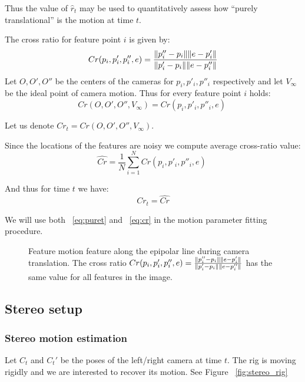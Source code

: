 \documentclass[10pt]{article}         %
\DeclarePairedDelimiter\norm{\lVert}{\rVert}%
\begin{document}
Thus the value of $\hat{r}_t$ may be used to quantitatively assess how
``purely translational'' is the motion at time $t$.

The cross ratio for feature point $i$ is given by:
\[
Cr(p_i,p'_i,p''_i,e) =
\frac{\norm{p''_i-p_i}\norm{e-p'_i}}{\norm{p'_i-p_i}\norm{e-p''_i}}
\]
Let $O,O',O''$ be the centers of the cameras for $p_i,p'_i,p''_i$
respectively and let $V_\infty$ be the ideal point of camera motion.
Thus for every feature point $i$ holds:
\[
Cr(O,O',O'',V_{\infty}) = Cr(p_i,p'_i,p''_i,e) \;
\]

Let us denote $Cr_t = Cr(O,O',O'',V_{\infty})$.

Since the locations of the features are noisy we compute average
cross-ratio value:
\[
\hat{Cr} =  \frac{1}{N}\sum_{i=1}^NCr(p_i,p'_i,p''_i,e) \;
\]

And thus for time $t$ we have:
\begin{equation}\label{eq:cr}
  Cr_t = \hat{Cr}
\end{equation}

We will use both ~\ref{eq:puret} and ~\ref{eq:cr} in the motion
parameter fitting procedure.

\begin{figure}[!h]
  \centering
  \caption{Feature motion feature along the epipolar line during
    camera translation.  The cross ratio $Cr(p_i,p'_i,p''_i,e) =
    \frac{\norm{p''_i-p_i}\norm{e-p'_i}}
    {\norm{p'_i-p_i}\norm{e-p''_i}}$ has the same value for all
    features in the image.}
  \label{fig:cross_ratio}
\end{figure}

\subsection{Stereo setup}

\subsubsection{Stereo motion estimation}\label{algo}
Let $C_t$ and $C_t'$ be the poses of the left/right camera at time
$t$. The rig is moving rigidly and we are interested to recover its
motion. See Figure ~\ref{fig:stereo_rig}
\end{document}
